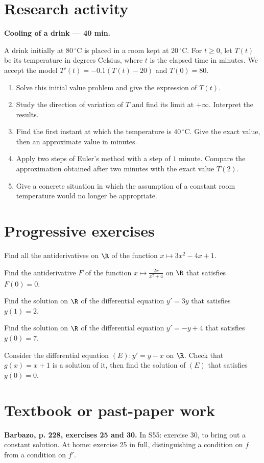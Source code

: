 \section{Research activity}\textbf{Cooling of a drink --- 40 min.}\par A drink initially at $80\,^{\circ}\mathrm C$ is placed in a room kept at $20\,^{\circ}\mathrm C$. For $t\ge0$, let $T(t)$ be its temperature in degrees Celsius, where $t$ is the elapsed time in minutes. We accept the model $T' (t)=-\num{0,1}(T(t)-20)$ and $T(0)=80$.
\begin{enumerate}\item Solve this initial value problem and give the expression of $T(t)$.
\item Study the direction of variation of $T$ and find its limit at $+\infty$. Interpret the results.
\item Find the first instant at which the temperature is $40\,^{\circ}\mathrm C$. Give the exact value, then an approximate value in minutes.
\item Apply two steps of Euler's method with a step of $1$ minute. Compare the approximation obtained after two minutes with the exact value $T(2)$.
\item Give a concrete situation in which the assumption of a constant room temperature would no longer be appropriate.\end{enumerate}

\mxnewpage
\section{Progressive exercises}

Find all the antiderivatives on $\R$ of the function $x\mapsto3x^2-4x+1$.

Find the antiderivative $F$ of the function $x\mapsto\frac{2x}{x^2+4}$ on $\R$ that satisfies $F(0)=0$.

Find the solution on $\R$ of the differential equation $y' =3y$ that satisfies $y(1)=2$.

Find the solution on $\R$ of the differential equation $y' =-y+4$ that satisfies $y(0)=7$.

Consider the differential equation $(E):y' =y-x$ on $\R$. Check that $g(x)=x+1$ is a solution of it, then find the solution of $(E)$ that satisfies $y(0)=0$.

\section{Textbook or past-paper work}\textbf{Barbazo, p. 228, exercises 25 and 30.} In S55: exercise 30, to bring out a constant solution. At home: exercise 25 in full, distinguishing a condition on $f$ from a condition on $f'$.

